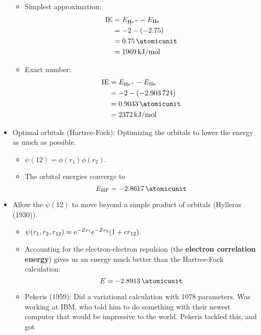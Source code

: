 \documentclass[../notes.tex]{subfiles}
\begin{document}
\begin{itemize}
\begin{itemize}
        \item Simplest approximation:
        \begin{align*}
            \text{IE} &= E_{\ce{He+}}-E_{\ce{He}}\\
            &= -2-(-2.75)\\
            &= \SI{0.75}{\atomicunit}\\
            &= \SI[per-mode=symbol]{1969}{\kilo\joule\per\mole}
        \end{align*}
        \item Exact number:
        \begin{align*}
            \text{IE} &= E_{\ce{He+}}-E_{\ce{He}}\\
            &= -2-(\num{-2.903724})\\
            &= \SI{0.9033}{\atomicunit}\\
            &= \SI[per-mode=symbol]{2372}{\kilo\joule\per\mole}
        \end{align*}
    \end{itemize}
    \item Optimal orbitals (Hartree-Fock): Optimizing the orbitals to lower the energy as much as possible.
    \begin{itemize}
        \item $\psi(12)=\phi(r_1)\phi(r_2)$.
        \item The orbital energies converge to
        \begin{equation*}
            E_\text{HF} = \SI{-2.8617}{\atomicunit}
        \end{equation*}
    \end{itemize}
    \item Allow the $\psi(12)$ to move beyond a simple product of orbitals (Hylleras (1930)).
    \begin{itemize}
        \item $\psi(r_1,r_2,r_{12})=\e[-Zr_1]\e[-Zr_2](1+cr_{12})$.
        \item Accounting for the electron-electron repulsion (the \textbf{electron correlation energy}) gives us an energy much better than the Hartree-Fock calculation:
        \begin{equation*}
            E = \SI{-2.8913}{\atomicunit}
        \end{equation*}
        \item Pekeris (1959): Did a variational calculation with 1078 parameters. Was working at IBM, who told him to do something with their newest computer that would be impressive to the world. Pekeris tackled this, and got

\end{itemize}
\end{itemize}
\end{document}
